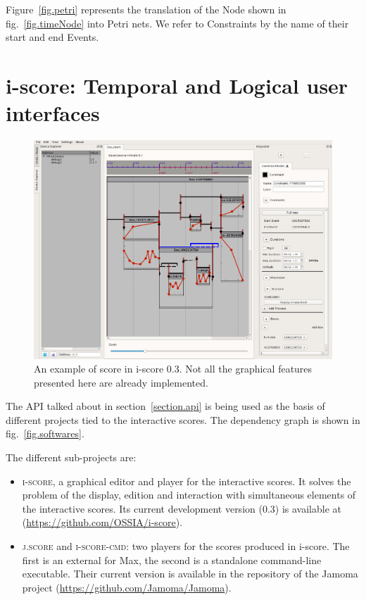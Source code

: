 \documentclass{article}
\begin{document}
	Figure~\ref{fig.petri} represents the translation of the Node shown in fig.~\ref{fig.timeNode} into Petri nets. We refer to Constraints by the name of their start and end Events. 

	\section{i-score: Temporal and Logical user interfaces}
	\label{section.userinterface}
	\begin{figure}
	\centering
	\includegraphics[width=0.9\columnwidth]{iscoreArticle.png}
	\caption{An example of score in i-score 0.3. Not all the graphical features presented here are already implemented.}
	\label{fig.iscore03}
	\end{figure}
	
	The API talked about in section~\ref{section.api} is being used as the basis of different projects tied to the interactive scores. The dependency graph is shown in fig.~\ref{fig.softwares}.

	The different sub-projects are: 
	\begin{itemize}
	\item \textsc{i-score}, a graphical editor and player for the interactive scores. It solves the problem of the display, edition and interaction with simultaneous elements of the interactive scores. Its current development version (0.3) is available at  (\url{https://github.com/OSSIA/i-score}).
	\item \textsc{j.score} and \textsc{i-score-cmd}: two players for the scores produced in i-score. The first is an external for Max, the second is a standalone command-line executable. Their current version is available in the repository of the Jamoma project (\url{https://github.com/Jamoma/Jamoma}).
	\end{itemize}
\end{document}

